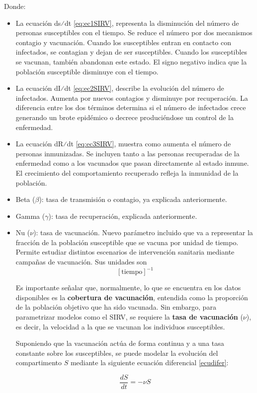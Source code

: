 Donde:
\begin{itemize}
    \item 	La ecuación ds⁄dt \eqref{eq:ec1SIRV}, representa la disminución del número de personas susceptibles con el tiempo. Se reduce el número por dos mecanismos contagio y vacunación. Cuando los susceptibles entran en contacto con infectados, se contagian y dejan de ser susceptibles. Cuando los susceptibles se vacunan, también abandonan este estado. El signo negativo indica que la población susceptible disminuye con el tiempo.
    \item 	La ecuación dI⁄dt \eqref{eq:ec2SIRV}, describe la evolución del número de infectados. Aumenta por nuevos contagios y disminuye por recuperación. La diferencia entre los dos términos determina si el número de infectados crece generando un brote epidémico o decrece produciéndose un control de la enfermedad.
    \item 	La ecuación dR⁄dt \eqref{eq:ec3SIRV}, muestra como aumenta el número de personas inmunizadas. Se incluyen tanto a las personas recuperadas de la enfermedad como a los vacunados que pasan directamente al estado inmune. El crecimiento del comportamiento recuperado refleja la inmunidad de la población.
    \item 	Beta ($\beta$): tasa de transmisión o contagio, ya explicada anteriormente.
    \item 	Gamma ($\gamma$): tasa de recuperación, explicada anteriormente.
    \item	Nu ($\nu$): tasa de vacunación. Nuevo parámetro incluido que va a representar la fracción de la población susceptible que se vacuna por unidad de tiempo. Permite estudiar distintos escenarios de intervención sanitaria mediante campañas de vacunación. Sus unidades son
\[
[\text{tiempo}]^{-1}
\]

Es importante señalar que, normalmente, lo que se encuentra en los datos disponibles es la \textbf{cobertura de vacunación}, entendida como la proporción de la población objetivo que ha sido vacunada. Sin embargo, para parametrizar modelos como el SIRV, se requiere la \textbf{tasa de vacunación} ($\nu$), es decir, la velocidad a la que se vacunan los individuos susceptibles.

Suponiendo que la vacunación actúa de forma continua y a una tasa constante sobre los susceptibles, se puede modelar la evolución del compartimento $S$ mediante la siguiente ecuación diferencial \eqref{ecudifer}:


\begin{equation}
\frac{dS}{dt} = -\nu S
\label{ecudifer}
\end{equation}


\end{itemize}
